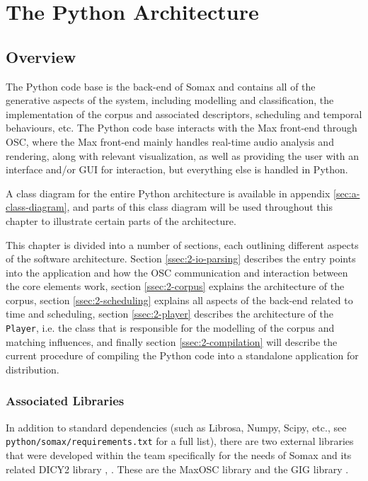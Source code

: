 \chapter{The Python Architecture}\label{sec:2-python-architecture}

\section{Overview}\label{ssec:2-overview}
The Python code base is the back-end of Somax and contains all of the generative aspects of the system, including modelling and classification, the implementation of the corpus and associated descriptors, scheduling and temporal behaviours, etc. The Python code base interacts with the Max front-end through OSC, where the Max front-end mainly handles real-time audio analysis and rendering, along with relevant visualization, as well as providing the user with an interface and/or GUI for interaction, but everything else is handled in Python.

A class diagram for the entire Python architecture is available in appendix \ref{sec:a-class-diagram}, and parts of this class diagram will be used throughout this chapter to illustrate certain parts of the architecture.

This chapter is divided into a number of sections, each outlining different aspects of the software architecture. Section \ref{ssec:2-io-parsing} describes the entry points into the application and how the OSC communication and interaction between the core elements work, section \ref{ssec:2-corpus} explains the architecture of the corpus, section \ref{ssec:2-scheduling} explains all aspects of the back-end related to time and scheduling, section \ref{ssec:2-player} describes the architecture of the \texttt{Player}, i.e. the class that is responsible for the modelling of the corpus and matching influences, and finally section \ref{ssec:2-compilation} will describe the current procedure of compiling the Python code into a standalone application for distribution.


\subsection{Associated Libraries}\label{ssec:2-librarybranches}
In addition to standard dependencies (such as Librosa, Numpy, Scipy, etc., see \texttt{python/somax/requirements.txt} for a full list), there are two external libraries that were developed within the team specifically for the needs of Somax and its related DICY2 library \cite{nika2016thesis}, \cite{nika2022dicy2}. These are the MaxOSC library \cite{maxoscrepo} and the GIG library \cite{gigrepo}. 



